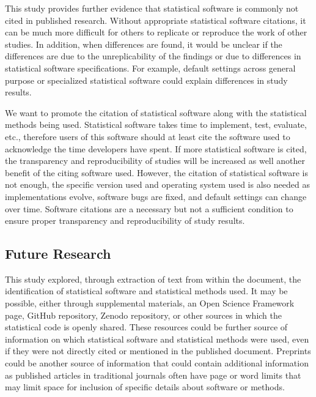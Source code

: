 \documentclass[english,,man]{apa6}
\begin{document}
This study provides further evidence that statistical software is commonly not cited in published research. Without appropriate statistical software citations, it can be much more difficult for others to replicate or reproduce the work of other studies. In addition, when differences are found, it would be unclear if the differences are due to the unreplicability of the findings or due to differences in statistical software specifications. For example, default settings across general purpose or specialized statistical software could explain differences in study results.

We want to promote the citation of statistical software along with the statistical methods being used. Statistical software takes time to implement, test, evaluate, etc., therefore users of this software should at least cite the software used to acknowledge the time developers have spent. If more statistical software is cited, the transparency and reproducibility of studies will be increased as well another benefit of the citing software used. However, the citation of statistical software is not enough, the specific version used and operating system used is also needed as implementations evolve, software bugs are fixed, and default settings can change over time. Software citations are a necessary but not a sufficient condition to ensure proper transparency and reproducibility of study results.

\hypertarget{future-research}{%
\subsection{Future Research}\label{future-research}}

This study explored, through extraction of text from within the document, the identification of statistical software and statistical methods used. It may be possible, either through supplemental materials, an Open Science Framework page, GitHub repository, Zenodo repository, or other sources in which the statistical code is openly shared. These resources could be further source of information on which statistical software and statistical methods were used, even if they were not directly cited or mentioned in the published document. Preprints could be another source of information that could contain additional information as published articles in traditional journals often have page or word limits that may limit space for inclusion of specific details about software or methods.

\newpage
\end{document}
